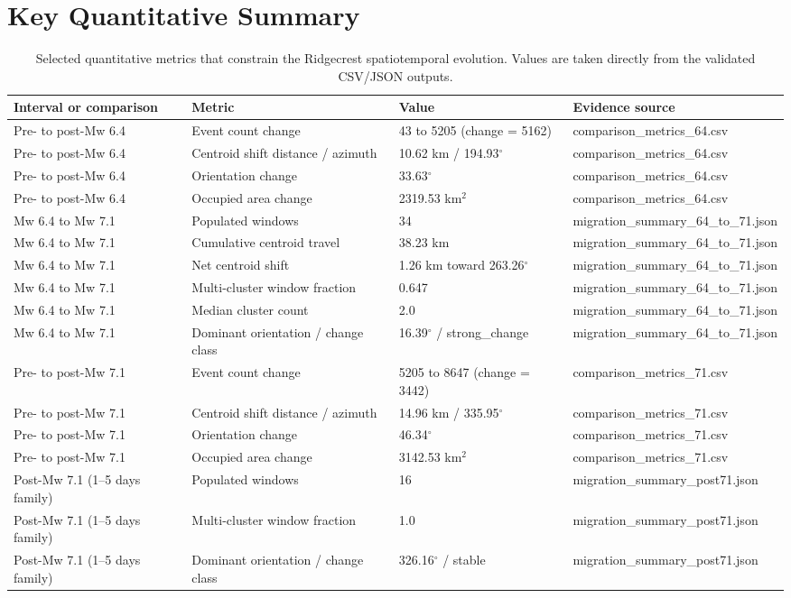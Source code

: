 \documentclass[11pt]{article}
\begin{document}
\section{Key Quantitative Summary}
\begin{table}[H]
\centering
\caption{Selected quantitative metrics that constrain the Ridgecrest spatiotemporal evolution. Values are taken directly from the validated CSV/JSON outputs.}
\label{tab:metrics}
\begin{tabularx}{\textwidth}{P{4.0cm} P{5.2cm} Y Y}
\toprule
Interval or comparison & Metric & Value & Evidence source \\
\midrule
Pre- to post-Mw 6.4 & Event count change & 43 to 5205 (change = 5162) & comparison\_metrics\_64.csv \\
Pre- to post-Mw 6.4 & Centroid shift distance / azimuth & 10.62 km / 194.93$^{\circ}$ & comparison\_metrics\_64.csv \\
Pre- to post-Mw 6.4 & Orientation change & 33.63$^{\circ}$ & comparison\_metrics\_64.csv \\
Pre- to post-Mw 6.4 & Occupied area change & 2319.53 km$^2$ & comparison\_metrics\_64.csv \\
Mw 6.4 to Mw 7.1 & Populated windows & 34 & migration\_summary\_64\_to\_71.json \\
Mw 6.4 to Mw 7.1 & Cumulative centroid travel & 38.23 km & migration\_summary\_64\_to\_71.json \\
Mw 6.4 to Mw 7.1 & Net centroid shift & 1.26 km toward 263.26$^{\circ}$ & migration\_summary\_64\_to\_71.json \\
Mw 6.4 to Mw 7.1 & Multi-cluster window fraction & 0.647 & migration\_summary\_64\_to\_71.json \\
Mw 6.4 to Mw 7.1 & Median cluster count & 2.0 & migration\_summary\_64\_to\_71.json \\
Mw 6.4 to Mw 7.1 & Dominant orientation / change class & 16.39$^{\circ}$ / strong\_change & migration\_summary\_64\_to\_71.json \\
Pre- to post-Mw 7.1 & Event count change & 5205 to 8647 (change = 3442) & comparison\_metrics\_71.csv \\
Pre- to post-Mw 7.1 & Centroid shift distance / azimuth & 14.96 km / 335.95$^{\circ}$ & comparison\_metrics\_71.csv \\
Pre- to post-Mw 7.1 & Orientation change & 46.34$^{\circ}$ & comparison\_metrics\_71.csv \\
Pre- to post-Mw 7.1 & Occupied area change & 3142.53 km$^2$ & comparison\_metrics\_71.csv \\
Post-Mw 7.1 (1--5 days family) & Populated windows & 16 & migration\_summary\_post71.json \\
Post-Mw 7.1 (1--5 days family) & Multi-cluster window fraction & 1.0 & migration\_summary\_post71.json \\
Post-Mw 7.1 (1--5 days family) & Dominant orientation / change class & 326.16$^{\circ}$ / stable & migration\_summary\_post71.json \\
\bottomrule
\end{tabularx}
\end{table}
\end{document}
